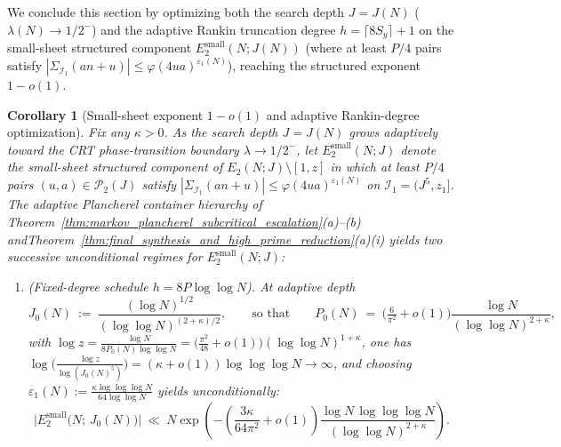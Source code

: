 \documentclass[11pt, a4paper]{article}
\theoremstyle{plain}
\newtheorem{corollary}[theorem]{Corollary}
\theoremstyle{definition}
\begin{document}
We conclude this section by optimizing both the search depth $J=J(N)$ ($\lambda(N)\to 1/2^{-}$) and the adaptive Rankin truncation degree $h=\lceil 8S_y\rceil+1$ on the small-sheet structured component $E_2^{\mathrm{small}}(N;J(N))$ (where at least $P/4$ pairs satisfy $|\Sigma_{\mathcal{I}_1}(an+u)|\le\allowbreak\varphi(4ua)^{\varepsilon_1(N)}$), reaching the structured exponent $1-o(1)$.

\begin{corollary}[Small-sheet exponent $1-o(1)$ and adaptive Rankin-degree optimization]\label{cor:optimal_adaptive_depth_1_minus_o1}
Fix any $\kappa>0$. As the search depth $J=J(N)$ grows adaptively toward the CRT phase-transition boundary $\lambda\to 1/2^{-}$, let $E_2^{\mathrm{small}}(N;J)$ denote the small-sheet structured component of $E_2(N;J)\setminus[1,z]$ in which at least $P/4$ pairs $(u,a)\in\mathcal{P}_2(J)$ satisfy $|\Sigma_{\mathcal{I}_1}(an+u)|\le\varphi(4ua)^{\varepsilon_1(N)}$ on $\mathcal{I}_1=(J^{5},z_1]$. The adaptive Plancherel container hierarchy of Theorem~\ref{thm:markov_plancherel_subcritical_escalation}(a)--(b) and\linebreak Theorem~\ref{thm:final_synthesis_and_high_prime_reduction}(a)(i) yields two successive unconditional regimes for $E_2^{\mathrm{small}}(N;J)$:
\begin{enumerate}[label=(\alph*)]
    \item \emph{(Fixed-degree schedule $h=8P\log\log N$).} 
    At adaptive depth
    \begin{equation}\label{eq:adaptive_depth_JN}
    J_0(N)\ :=\ \frac{(\log N)^{1/2}}{(\log\log N)^{(2+\kappa)/2}},\qquad\text{so that}\qquad P_0(N)\ =\ \big(\tfrac{6}{\pi^{2}}+o(1)\big)\frac{\log N}{(\log\log N)^{2+\kappa}},
    \end{equation}
    with $\log z=\frac{\log N}{8P_0(N)\log\log N}=\big(\frac{\pi^{2}}{48}+o(1)\big)(\log\log N)^{1+\kappa}$, one has $\log\big(\frac{\log z}{\log(J_0(N)^{5})}\big)=(\kappa+o(1))\log\log\log N\to\infty$, and choosing $\varepsilon_1(N):=\frac{\kappa\log\log\log N}{64\log\log N}$ yields unconditionally:
    \begin{equation}\label{eq:unconditional_1_minus_o1_bound}
    \big|E_2^{\mathrm{small}}\big(N;\,J_0(N)\big)\big|\ \ll\ N\exp\!\left(-\left(\frac{3\kappa}{64\pi^{2}}+o(1)\right)\frac{\log N\,\log\log\log N}{(\log\log N)^{2+\kappa}}\right).
    \end{equation}
    

\end{enumerate}
\end{corollary}
\end{document}
